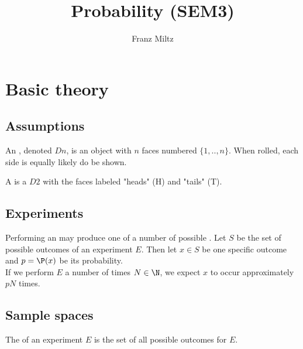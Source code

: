 \documentclass{article}
\begin{document}
\title{Probability (SEM3)}
\author{Franz Miltz}
\maketitle
\tableofcontents
\pagebreak

\section{Basic theory}
\subsection{Assumptions}
\begin{definition}
    An , denoted $Dn$, is an object with $n$ faces numbered $\{1,..,n\}$.
    When rolled, each side is equally likely do be shown.
\end{definition}
\begin{definition}
    A  is a $D2$ with the faces labeled "heads" (H) and "tails" (T).
\end{definition}
\subsection{Experiments}
\begin{definition}
    Performing an  may produce one of a number of possible .
    Let $S$ be the set of possible outcomes of an experiment $E$. Then let $x\in S$ be one specific outcome and
    $p=\P(x)$ be its probability.\\
    If we perform $E$ a number of times $N\in\N$, we expect $x$ to occur approximately $pN$ times.
\end{definition}
\subsection{Sample spaces}
\begin{definition}
    The  of an experiment $E$ is the set of all possible outcomes for $E$.
\end{definition}
\end{document}
